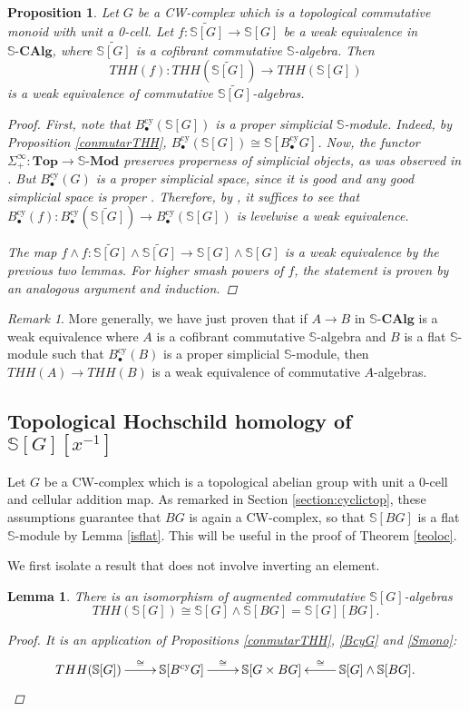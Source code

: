 \documentclass[a4paper,11pt]{amsart} %
\theoremstyle{definition} \newtheorem{defn}[equation]{Definition}
\theoremstyle{remark} \newtheorem{notation}[equation]{Notation}
\theoremstyle{plain} \newtheorem{teo}[equation]{Theorem}
\theoremstyle{plain} \newtheorem{lema}[equation]{Lemma}
\theoremstyle{plain} \newtheorem{prop}[equation]{Proposition}
\theoremstyle{plain} \newtheorem{corolario}[equation]{Corollary}
\theoremstyle{remark} \newtheorem{obs}[equation]{Remark}
\theoremstyle{remark} \newtheorem{sideobs}[equation]{Side remark}
\theoremstyle{remark} \newtheorem{ejercicio}[equation]{Exercise}
\theoremstyle{definition} \newtheorem{notn}[equation]{Notation}
\theoremstyle{remark} \newtheorem{ej}[equation]{Example}
\theoremstyle{remark} \newtheorem{contraej}[equation]{Counterexample}
\theoremstyle{plain} \newtheorem{conj}[equation]{Conjecture}
\renewcommand{\1}{\ensuremath{\mathbbm{1}}}
\renewcommand{\S}{\mathbb{S}}
\newcommand{\bprop}{\begin{prop}}
\newcommand{\eprop}{\end{prop}}
\newcommand{\bprf}{\begin{proof}}
\newcommand{\eprf}{\end{proof}}
\newcommand{\bobs}{\begin{obs}}
\newcommand{\eobs}{\end{obs}}
\newcommand{\SCAlg}{\ensuremath{\mathbb{S}}\mbox{-}\ensuremath{\mathbf{CAlg}}}
\newcommand{\SMod}{\ensuremath{\mathbb{S}}\mbox{-}\ensuremath{\textbf{Mod}}}
\newcommand{\Top}{\ensuremath{\mathbf{Top}}}
\newcommand{\cy}{\mathrm{cy}}
\newcommand{\sip}{\Sigma^\infty_+}
\numberwithin{equation}{section}
\begin{document}
%

%
%
\bprop \label{pseudocof-thh} Let $G$ be a CW-complex which is a topological commutative monoid with unit a 0-cell. Let $f:\widetilde{\S[G]}\to \S[G]$ be a weak equivalence in $\SCAlg$, where $\widetilde{\S[G]}$ is a cofibrant commutative $\S$-algebra. Then \[THH(f):THH(\widetilde{\S[G]})\to THH(\S[G])\] is a weak equivalence of commutative $\widetilde{\S[G]}$-algebras. %
\bprf First, note that $B_\bullet^\cy(\S[G])$ is a proper simplicial $\S$-module. Indeed, by Proposition \ref{conmutarTHH}, $B_\bullet^\cy(\S[G])\cong \S[B_\bullet^\cy G]$. Now, the functor $\sip:\Top\to \SMod$ preserves properness of simplicial objects, as was observed in \cite[IV.7.8]{ekmm}. But $B^\cy_\bullet(G)$ is a proper simplicial space, since it is good \cite[3.2]{thh-thom} %
%
%
and %
any good simplicial space is proper \cite[Proof of 2.4(b)]{lewis-lillig}. Therefore, by \cite[X.2.4]{ekmm}, it suffices to see that $B^\cy_\bullet(f):B^\cy_\bullet(\widetilde{\S[G]})\to B^\cy_\bullet(\S[G])$ is levelwise a weak equivalence.

The map $f\wedge f: \widetilde{\S[G]} \wedge \widetilde{\S[G]} \to \S[G]\wedge \S[G]$ is a weak equivalence by the previous two lemmas.  For higher smash powers of $f$, the statement is proven by an analogous argument and induction.
\eprf
\eprop

\bobs More generally, we have just proven that if $A\to B$ in $\SCAlg$ is a weak equivalence where $A$ is a cofibrant commutative $\S$-algebra and $B$ is a flat $\S$-module such that $B_\bullet^\cy(B)$ is a proper simplicial $\S$-module, then $THH(A)\to THH(B)$ is a weak equivalence of commutative $A$-algebras. %
\eobs


\subsection{Topological Hochschild homology of \texorpdfstring{$\S[G][x^{-1}]$}{S[G][1/x]}}

Let $G$ be a CW-complex which is a topological abelian group with unit a 0-cell and cellular addition map. As remarked in Section \ref{section:cyclictop}, these assumptions guarantee that $BG$ is again a CW-complex, so that $\S[BG]$ is a flat $\S$-module by Lemma \ref{isflat}. This will be useful in the proof of Theorem  \ref{teoloc}. %
%

We first isolate a result that does not involve inverting an element.%
\begin{lema} \label{sinloc} There is an isomorphism of augmented commutative $\S[G]$-algebras
\[THH(\S[G]) \cong \S[G] \wedge \S[BG] = \S[G][BG].\]
\bprf It is an application of Propositions \ref{conmutarTHH}, \ref{BcyG} and \ref{Smono}:
\[\xymatrix{THH(\S[G]) \ar[r]^-\cong & \S[B^\cy G] \ar[r]^-\cong & \S[G\times BG] & \S[G] \wedge \S[BG] \ar[l]_-\cong.}\qedhere\] 
%
%
%
\eprf
\end{lema}
\end{document}
